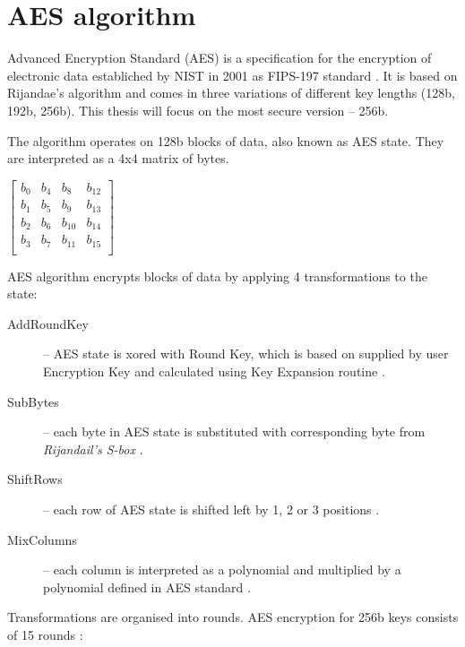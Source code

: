 \section{AES algorithm}
\label{sec:aes-algorithm}
Advanced Encryption Standard (AES) is a specification for the encryption of electronic data establiched by NIST in 2001 as FIPS-197 standard \cite{aes-standard}. It is based on Rijandae's algorithm and comes in three variations of different key lengths (128b, 192b, 256b). This thesis will focus on the most secure version -- 256b.

The algorithm operates on 128b blocks of data, also known as AES state. They are interpreted as a 4x4 matrix of bytes.

\begin{center}
$\begin{bmatrix}
b_0 & b_4 & b_8    & b_{12} \\
b_1 & b_5 & b_9    & b_{13} \\
b_2 & b_6 & b_{10} & b_{14} \\
b_3 & b_7 & b_{11} & b_{15} \\
\end{bmatrix}$
\end{center}

AES algorithm encrypts blocks of data by applying 4 transformations to the state:

\begin{description}
\item[AddRoundKey] -- AES state is xored with Round Key, which is based on supplied by user Encryption Key and calculated using Key Expansion routine \cite[Fig. 10, 11]{aes-standard}.
\item[SubBytes] -- each byte in AES state is substituted with corresponding byte from \textit{Rijandail's S-box} \cite[Fig. 7]{aes-standard}.
\item[ShiftRows] -- each row of AES state is shifted left by 1, 2 or 3 positions \cite[Fig. 8]{aes-standard}.
\item[MixColumns] -- each column is interpreted as a polynomial and multiplied by a polynomial defined in AES standard \cite[Fig. 9]{aes-standard}.
\end{description}

Transformations are organised into rounds. AES encryption for 256b keys consists of 15 rounds \cite[Fig. 5]{aes-standard}:

